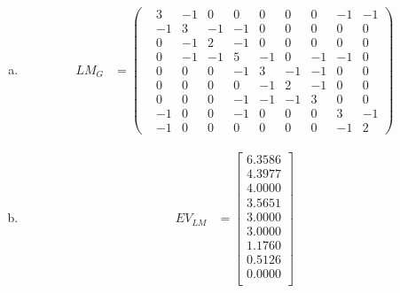 \documentclass[10pt,letterpaper, cm]{hmcpset}
\begin{document}
\begin{enumerate}[(a)]

    \item 
    
    \begin{align*}

      LM_G &= \begin{pmatrix}



           & 3 & -1 & 0 & 0 & 0 & 0 & 0 & -1 & -1 \\

           & -1 & 3 & -1 & -1 & 0 & 0 & 0 & 0 & 0 \\

           & 0 & -1 & 2 & -1 & 0 & 0 & 0 & 0 & 0 \\

           & 0 & -1 & -1 & 5 & -1 & 0 & -1 & -1 & 0  \\

           & 0 & 0 & 0 & -1 & 3 & -1 & -1 & 0 & 0 \\

           & 0 & 0 & 0 & 0 & -1 & 2 & -1 & 0 & 0 \\

           & 0 & 0 & 0 & -1 & -1 & -1 & 3 & 0 & 0 \\

           & -1 & 0 & 0 & -1 & 0 & 0 & 0 & 3 & -1 \\

           & -1 & 0 & 0 & 0 & 0 & 0 & 0 & -1 & 2

      \end{pmatrix}  
              \end{align*}

  \item
    \begin{align*}
      EV_{LM} & = \begin{bmatrix}
        6.3586\\
        4.3977\\
        4.0000\\
        3.5651\\
        3.0000\\
        3.0000\\
        1.1760\\
        0.5126\\
        0.0000\\
      \end{bmatrix}
    \end{align*}
\end{enumerate}
\end{document}
